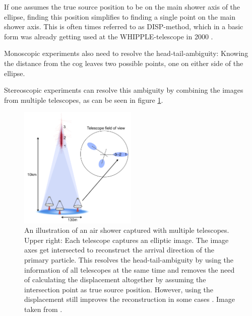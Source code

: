 If one assumes the true source position to be on the main shower axis of the ellipse,
finding this position simplifies to finding a single point on the main shower axis.
This is often times referred to as DISP-method,
which in a basic form was already getting used at 
the WHIPPLE-telescope in 2000 \cite{Lessard:2000yf}.

Monoscopic experiments also need to resolve the head-tail-ambiguity:
Knowing the distance from the cog leaves two possible points, one on either side 
of the ellipse.

Stereoscopic experiments can resolve this ambiguity by combining the images from 
multiple telescopes, as can be seen in figure \ref{fig:stereo_shower}.

\begin{figure}
	\centering
	\includegraphics[width=0.5\textwidth]{images/stereo_shower.png}
	\caption{An illustration of an air shower captured with multiple telescopes.
		Upper right: Each telescope captures an elliptic image.
		The image axes get intersected to reconstruct the arrival direction
		of the primary particle. This resolves the head-tail-ambiguity
		by using the information of all telescopes at the same time
		and removes the need of calculating the displacement altogether by
		assuming the intersection point as true source position.
		However, using the displacement still improves the reconstruction 
		in some cases \cite{some magic paper states that }.
	    Image taken from \cite{holder2015atmospheric}.}
	\label{fig:stereo_shower}
\end{figure}

